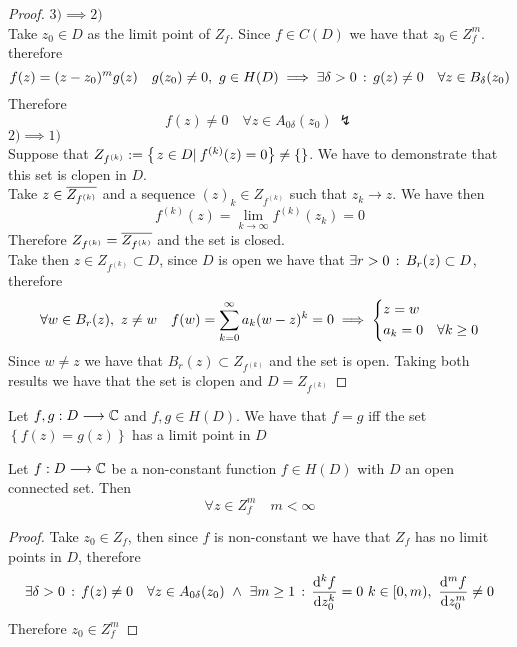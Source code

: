\documentclass[../complete.tex]{subfiles}
\begin{document}
\begin{proof}
	$3)\implies 2)$\\
	Take $z_0\in D$ as the limit point of $Z_f$. Since $f\in C(D)$ we have that $z_0\in Z_f^m$. therefore
	\begin{equation*}
		f(z)=(z-z_0)^mg(z)\quad g(z_0)\ne0,\ g\in H(D)\implies\exists\delta>0\, :\,  g(z)\ne0\quad\forall z\in B_\delta(z_0)
	\end{equation*}
	Therefore
	\begin{equation*}
		f(z)\ne0\quad\forall z\in A_{0\delta}(z_0)\ \lightning
	\end{equation*}
	$2)\implies1)$\\
	Suppose that $Z_{f^{(k)}}:=\left\{ \left.z\in D\right|_{}f^{(k)}(z)=0 \right\}\ne\{\}$. We have to demonstrate that this set is clopen in $D$.\\
	Take $z\in\overline{Z_{f^{(k)}}}$ and a sequence $(z)_k\in Z_{f^{(k)}}$ such that $z_k\to z$. We have then
	\begin{equation*}
		f^{(k)}(z)=\lim_{k\to\infty}f^{(k)}(z_k)=0
	\end{equation*}
	Therefore $Z_{f^{(k)}}=\overline{Z_{f^{(k)}}}$ and the set is closed.\\
	Take then $z\in Z_{f^{(k)}}\subset D$, since $D$ is open we have that $\exists r>0\, :\,  B_r(z)\subset D$, therefore
	\begin{equation*}
		\forall w\in B_r(z),\ z\ne w\quad f(w)=\sum_{k=0}^\infty a_k(w-z)^k=0\implies\begin{dcases}z=w\\a_k=0&\forall k\ge0\end{dcases}
	\end{equation*}
	Since $w\ne z$ we have that $B_r(z)\subset Z_{f^{(k)}}$ and the set is open. Taking both results we have that the set is clopen and $D=Z_{f^{(k)}}$
\end{proof}
\begin{cor}
	Let $f,g:D\overset{}{\longrightarrow}\mathbb{C}$ and $f,g\in  H(D)$. We have that $f=g$ iff the set $\left\{ f(z)=g(z) \right\}$ has a limit point in $D$
\end{cor}
\begin{cor}
	Let $f:D\overset{}{\longrightarrow}\mathbb{C}$ be a non-constant function $f\in H(D)$ with $D$ an open connected set. Then
	\begin{equation*}
		\forall z\in Z_f^m\quad m<\infty
	\end{equation*}
\end{cor}
\begin{proof}
	Take $z_0\in Z_f$, then since $f$ is non-constant we have that $Z_f$ has no limit points in $D$, therefore
	\begin{equation*}
		\exists\delta>0\st f(z)\ne0\quad\forall z\in A_{0\delta}(z_0)\ \wedge\ \exists m\ge1\st\derivative[k]{f}{z_0}=0\ k\in[0,m),\ \derivative[m]{f}{z_0}\ne0
	\end{equation*}
	Therefore $z_0\in Z_f^m$
\end{proof}
\end{document}
